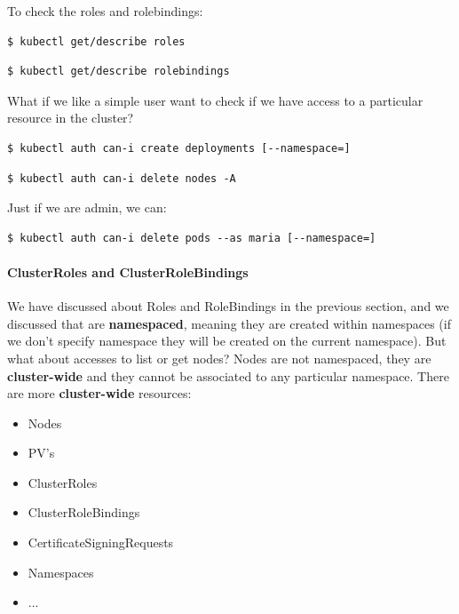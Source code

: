 \documentclass{article}
\newenvironment{codetemplate}[1][]{%
  \mybasecolorbox[#1]
  \itshape
}{%
  \endmybasecolorbox
}
\begin{document}
To check the roles and rolebindings:
\begin{codetemplate}{}
\begin{verbatim}
$ kubectl get/describe roles
\end{verbatim}
\end{codetemplate}
\begin{codetemplate}{}
\begin{verbatim}
$ kubectl get/describe rolebindings
\end{verbatim}
\end{codetemplate}

What if we like a simple user want to check if we have access to a particular resource in the cluster?
\begin{codetemplate}{}
\begin{verbatim}
$ kubectl auth can-i create deployments [--namespace=]
\end{verbatim}
\end{codetemplate}
\begin{codetemplate}{}
\begin{verbatim}
$ kubectl auth can-i delete nodes -A
\end{verbatim}
\end{codetemplate}

Just if we are admin, we can:
\begin{codetemplate}{}
\begin{verbatim}
$ kubectl auth can-i delete pods --as maria [--namespace=]
\end{verbatim}
\end{codetemplate}

\paragraph{ClusterRoles and ClusterRoleBindings}
We have discussed about Roles and RoleBindings in the previous section, and we discussed that are \textbf{namespaced}, meaning they are created within namespaces (if we don't specify namespace they will be created on the current namespace). But what about accesses to list or get nodes? Nodes are not namespaced, they are \textbf{cluster-wide} and they cannot be associated to any particular namespace. There are more \textbf{cluster-wide} resources:
\begin{itemize}
    \item Nodes
    \item PV's
    \item ClusterRoles
    \item ClusterRoleBindings
    \item CertificateSigningRequests
    \item Namespaces
    \item ...
\end{itemize}
\end{document}
